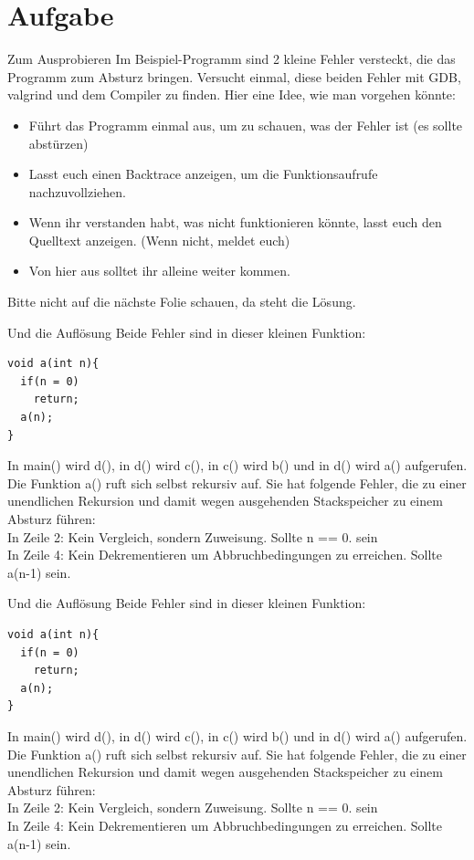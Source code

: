 \section{Aufgabe}
\begin{frame}{Zum Ausprobieren}
Im Beispiel-Programm sind 2 kleine Fehler versteckt, die das Programm zum Absturz bringen. Versucht einmal, diese beiden Fehler mit GDB, valgrind und dem Compiler zu finden. Hier eine Idee, wie man vorgehen könnte:
\begin{itemize}
 \item F\"uhrt das Programm einmal aus, um zu schauen, was der Fehler ist (es sollte abstürzen)
 \item Lasst euch einen Backtrace anzeigen, um die Funktionsaufrufe nachzuvollziehen.
 \item Wenn ihr verstanden habt, was nicht funktionieren könnte, lasst euch den Quelltext anzeigen. (Wenn nicht, meldet euch)
 \item Von hier aus solltet ihr alleine weiter kommen.
\end{itemize}
 Bitte nicht auf die n\"achste Folie schauen, da steht die Lösung. 
\end{frame}
\begin{frame}[fragile]{Und die Aufl\"osung}
Beide Fehler sind in dieser kleinen Funktion:
\begin{lstlisting}
void a(int n){
  if(n = 0)
    return;
  a(n);
}\end{lstlisting}
In main() wird d(), in d() wird c(), in c() wird b() und in d() wird a() aufgerufen. Die Funktion a() ruft sich selbst rekursiv auf. Sie hat folgende Fehler, die zu einer unendlichen Rekursion und damit wegen ausgehenden Stackspeicher zu einem Absturz f\"uhren:\\
In Zeile 2: Kein Vergleich, sondern Zuweisung. Sollte n == 0. sein\\
In Zeile 4: Kein Dekrementieren um Abbruchbedingungen zu erreichen. Sollte a(n-1) sein.
\end{frame}
\begin{frame}[fragile]{Und die Aufl\"osung}
Beide Fehler sind in dieser kleinen Funktion:
\begin{lstlisting}
void a(int n){
  if(n = 0)
    return;
  a(n);
}\end{lstlisting}
In main() wird d(), in d() wird c(), in c() wird b() und in d() wird a() aufgerufen. Die Funktion a() ruft sich selbst rekursiv auf. Sie hat folgende Fehler, die zu einer unendlichen Rekursion und damit wegen ausgehenden Stackspeicher zu einem Absturz f\"uhren:\\
In Zeile 2: Kein Vergleich, sondern Zuweisung. Sollte n == 0. sein\\
In Zeile 4: Kein Dekrementieren um Abbruchbedingungen zu erreichen. Sollte a(n-1) sein.
\end{frame}

